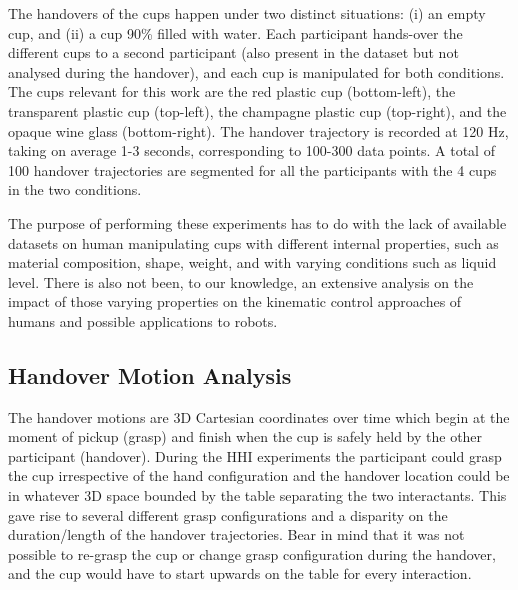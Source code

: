 The handovers of the cups happen under two distinct situations: (i) an empty cup, and (ii) a cup 90\% filled with water. Each participant hands-over the different cups to a second participant (also present in the dataset but not analysed during the handover), and each cup is manipulated for both conditions. The cups relevant for this work are the red plastic cup (bottom-left), the transparent plastic cup (top-left), the champagne plastic cup (top-right), and the opaque wine glass (bottom-right). The handover trajectory is recorded at 120 Hz, taking on average 1-3 seconds, corresponding to 100-300 data points. A total of 100 handover trajectories are segmented for all the participants with the 4 cups in the two conditions.

The purpose of performing these experiments has to do with the lack of available datasets on human manipulating cups with different internal properties, such as material composition, shape, weight, and with varying conditions such as liquid level. There is also not been, to our knowledge, an extensive analysis on the impact of those varying properties on the kinematic control approaches of humans and possible applications to robots. 

\subsection{Handover Motion Analysis}

The handover motions are 3D Cartesian coordinates over time which begin at the moment of pickup (grasp) and finish when the cup is safely held by the other participant (handover). During the HHI experiments the participant could grasp the cup irrespective of the hand configuration and the handover location could be in whatever 3D space bounded by the table separating the two interactants. This gave rise to several different grasp configurations and a disparity on the duration/length of the handover trajectories. Bear in mind that it was not possible to re-grasp the cup or change grasp configuration during the handover, and the cup would have to start upwards on the table for every interaction. 

